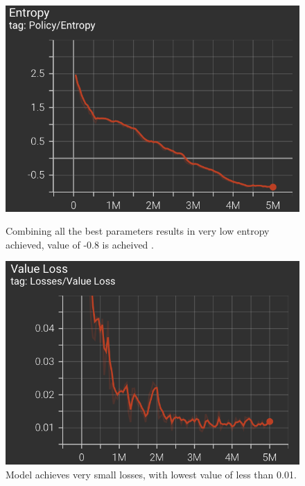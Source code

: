 \begin{figure}
\centering
\begin{multicols}{2}
\includegraphics[width=0.99\columnwidth]{Chapter3/Final/Final_Entropy.png}\par
\caption{Combining all the best parameters results in very low entropy achieved, value of -0.8 is acheived .}
\label{fig:final_entropy}

\includegraphics[width=0.99\columnwidth]{Chapter3/Final/Final_Value_loss.png}\par
\caption{
Model achieves very small losses, with lowest value of less than 0.01.
}
\label{fig:final_valueLoss}
\end{multicols}
\end{figure}
